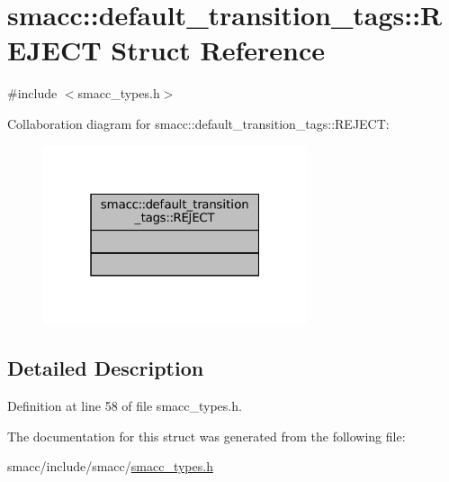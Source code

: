 \hypertarget{structsmacc_1_1default__transition__tags_1_1REJECT}{}\section{smacc\+:\+:default\+\_\+transition\+\_\+tags\+:\+:R\+E\+J\+E\+CT Struct Reference}
\label{structsmacc_1_1default__transition__tags_1_1REJECT}


{\ttfamily \#include $<$smacc\+\_\+types.\+h$>$}



Collaboration diagram for smacc\+:\+:default\+\_\+transition\+\_\+tags\+:\+:R\+E\+J\+E\+CT\+:
\nopagebreak
\begin{figure}[H]
\begin{center}
\leavevmode
\includegraphics[width=220pt]{structsmacc_1_1default__transition__tags_1_1REJECT__coll__graph}
\end{center}
\end{figure}


\subsection{Detailed Description}


Definition at line 58 of file smacc\+\_\+types.\+h.



The documentation for this struct was generated from the following file\+:\begin{DoxyCompactItemize}
\item 
smacc/include/smacc/\hyperlink{smacc__types_8h}{smacc\+\_\+types.\+h}\end{DoxyCompactItemize}
